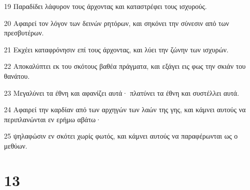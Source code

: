 \par 19 Παραδίδει λάφυρον τους άρχοντας και καταστρέφει τους ισχυρούς.
\par 20 Αφαιρεί τον λόγον των δεινών ρητόρων, και σηκόνει την σύνεσιν από των πρεσβυτέρων.
\par 21 Εκχέει καταφρόνησιν επί τους άρχοντας, και λύει την ζώνην των ισχυρών.
\par 22 Αποκαλύπτει εκ του σκότους βαθέα πράγματα, και εξάγει εις φως την σκιάν του θανάτου.
\par 23 Μεγαλύνει τα έθνη και αφανίζει αυτά· πλατύνει τα έθνη και συστέλλει αυτά.
\par 24 Αφαιρεί την καρδίαν από των αρχηγών των λαών της γης, και κάμνει αυτούς να περιπλανώνται εν ερήμω αβάτω·
\par 25 ψηλαφώσιν εν σκότει χωρίς φωτός, και κάμνει αυτούς να παραφέρωνται ως ο μεθύων.

\chapter{13}

